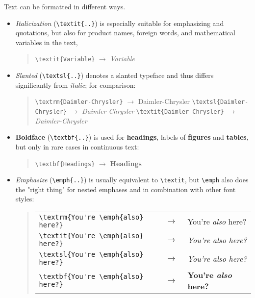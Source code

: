 Text can be formatted in different ways.
%
\begin{itemize}
    \item \textit{Italicization} (\verb!\textit{..}!) is especially suitable for
    emphasizing and quotations, but also for product names, foreign words, and
    mathematical variables in the text, \eg
    \begin{quote}
        \verb!\textit{Variable}! $\rightarrow$ \textit{Variable}
    \end{quote}
%
    \item \textsl{Slanted} (\verb!\textsl{..}!) denotes a slanted typeface and
    thus differs significantly from \textit{italic}; for comparison:
    \begin{quote}
        \verb!\textrm{Daimler-Chrysler}! $\rightarrow$
        \textrm{Daimler-Chrysler} \newline%
        \verb!\textsl{Daimler-Chrysler}! $\rightarrow$
        \textsl{Daimler-Chrysler} \newline%
        \verb!\textit{Daimler-Chrysler}! $\rightarrow$ \textit{Daimler-Chrysler}
    \end{quote}
%
    \item \textbf{Boldface} (\verb!\textbf{..}!) is used for \textbf{headings},
    labels of \textbf{figures} and \textbf{tables}, but only in rare cases in
    continuous text:
    \begin{quote}
        \verb!\textbf{Headings}! $\rightarrow$ \textbf{Headings}
    \end{quote}
%
    \item \emph{Emphasize} (\verb!\emph{..}!) is usually equivalent to
    \verb!\textit!, but \verb!\emph! also does the "right thing" for nested
    emphases and in combination with other font styles:
    \begin{quote}
        \setlength{\tabcolsep}{0pt}%
        \begin{tabular}{lcl}
            \verb!\textrm{You're \emph{also} here?}! & $\;\rightarrow\;$ &
            \textrm{You're \emph{also} here?} \\
            \verb!\textit{You're \emph{also} here?}! & $\;\rightarrow\;$ &
            \textit{You're \emph{also} here?} \\
            \verb!\textsl{You're \emph{also} here?}! & $\;\rightarrow\;$ &
            \textsl{You're \emph{also} here?} \\
            \verb!\textbf{You're \emph{also} here?}! & $\;\rightarrow\;$ &
            \textbf{You're \emph{also} here?} \\

\end{tabular}
\end{quote}
\end{itemize}
